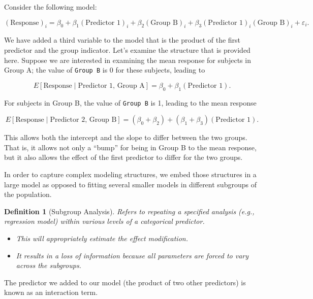 \documentclass[
]{book}
\providecommand{\tightlist}{%
  \setlength{\itemsep}{0pt}\setlength{\parskip}{0pt}}
\theoremstyle{plain}
\theoremstyle{mydefn}
\newtheorem{definition}{Definition}[chapter]
\theoremstyle{myexmpl}
\theoremstyle{remark}
\begin{document}
Consider the following model:

\[(\text{Response})_i = \beta_0 + \beta_1 (\text{Predictor 1})_i + \beta_2 (\text{Group B})_i + \beta_3 (\text{Predictor 1})_i (\text{Group B})_i + \varepsilon_i.\]

We have added a third variable to the model that is the product of the first predictor and the group indicator. Let's examine the structure that is provided here. Suppose we are interested in examining the mean response for subjects in Group A; the value of \texttt{Group\ B} is 0 for these subjects, leading to

\[E\left[\text{Response} \mid \text{Predictor 1, Group A}\right] = \beta_0 + \beta_1 (\text{Predictor 1}).\]

For subjects in Group B, the value of \texttt{Group\ B} is 1, leading to the mean response

\[E\left[\text{Response} \mid \text{Predictor 2, Group B}\right] = \left(\beta_0 + \beta_2\right) + \left(\beta_1 + \beta_3\right) (\text{Predictor 1}).\]

This allows both the intercept and the slope to differ between the two groups. That is, it allows not only a ``bump'' for being in Group B to the mean response, but it also allows the effect of the first predictor to differ for the two groups.

\begin{rmdkeyidea}
In order to capture complex modeling structures, we embed those structures in a large model as opposed to fitting several smaller models in different subgroups of the population.
\end{rmdkeyidea}

\begin{definition}[Subgroup Analysis]

Refers to repeating a specified analysis (e.g., regression model) within various levels of a categorical predictor.

\begin{itemize}
\tightlist
\item
  This will appropriately estimate the effect modification.
\item
  It results in a loss of information because \emph{all parameters} are forced to vary across the subgroups.
\end{itemize}

\end{definition}

The predictor we added to our model (the product of two other predictors) is known as an interaction term.
\end{document}
